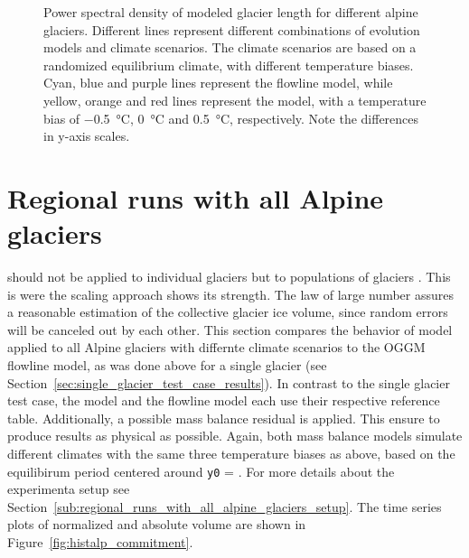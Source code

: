 \begin{figure}[htp]
\begin{subfigure}[b]{0.48\textwidth}
        \end{subfigure}

        \caption{Power spectral density of modeled glacier length for different alpine glaciers. Different lines represent different combinations of evolution models and climate scenarios. The climate scenarios are based on a randomized equilibrium climate, with different temperature biases. Cyan, blue and purple lines represent the flowline model, while yellow, orange and red lines represent the \vas{} model, with a temperature bias of \SI{-.5}{\celsius}, \SI{0}{\celsius} and \SI{+.5}{\celsius}, respectively. Note the differences in y-axis scales.}
        \label{fig:psd}
      \end{figure}
    


  \section{Regional runs with all Alpine glaciers} %
  \label{sec:regional_runs_with_all_alpine_glaciers_results}

    \Vas{} should not be applied to individual glaciers but to populations of glaciers \citep{Bahr2015}. This is were the scaling approach shows its strength. The law of large number assures a reasonable estimation of the collective glacier ice volume, since random errors will be canceled out by each other. This section compares the behavior of \vas{} model applied to all Alpine glaciers with differnte climate scenarios to the OGGM flowline model, as was done above for a single glacier (see Section~\ref{sec:single_glacier_test_case_results}).
    In contrast to the single glacier test case, the \vas{} model and the flowline model each use their respective \tstar{} reference table. Additionally, a possible mass balance residual \bias{} is applied. This ensure to produce results as physical as possible. Again, both mass balance models simulate different climates with the same three temperature biases as above, based on the equilibirum period centered around \lstinline`y0` = \tstar{}. For more details about the experimenta setup see Section~\ref{sub:regional_runs_with_all_alpine_glaciers_setup}. The time series plots of normalized and absolute volume are shown in Figure~\ref{fig:histalp_commitment}.

